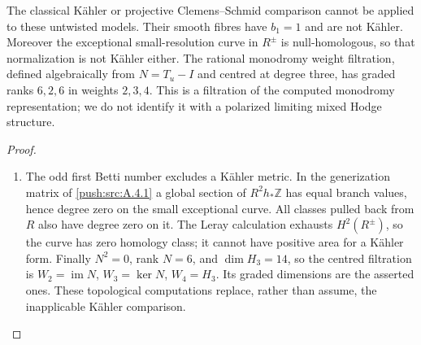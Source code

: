 \begin{proposition}\label{push:src:A.4.4}\label{push:A44}

The classical K\"ahler or projective Clemens--Schmid
comparison cannot be applied to these untwisted models.
Their smooth fibres have $b_1=1$ and are not K\"ahler.
Moreover the exceptional small-resolution curve in
$R^\pm$ is null-homologous, so that normalization is
not K\"ahler either. The rational monodromy weight
filtration, defined algebraically from $N=T_u-I$ and
centred at degree three, has graded ranks $6,2,6$ in
weights $2,3,4$. This is a filtration of the computed
monodromy representation; we do not identify it with
a polarized limiting mixed Hodge structure.
\end{proposition}


\begin{proof}
\begin{enumerate}[label=\arabic*.,leftmargin=*]
\item The odd first Betti number excludes a K\"ahler metric.
In the generization matrix of \ref{push:src:A.4.1} a global section of
$R^2h_*\mathbb Z$ has equal branch values, hence degree
zero on the small exceptional curve. All classes pulled
back from $R$ also have degree zero on it. The Leray
calculation exhausts $H^2(R^\pm)$, so the curve has
zero homology class; it cannot have positive area for
a K\"ahler form. Finally $N^2=0$, rank $N=6$, and
$\dim H_3=14$, so the centred filtration is
$W_2=\operatorname{im}N$, $W_3=\ker N$, $W_4=H_3$.
Its graded dimensions are the asserted ones. These
topological computations replace, rather than assume,
the inapplicable K\"ahler comparison.
\end{enumerate}
\end{proof}

